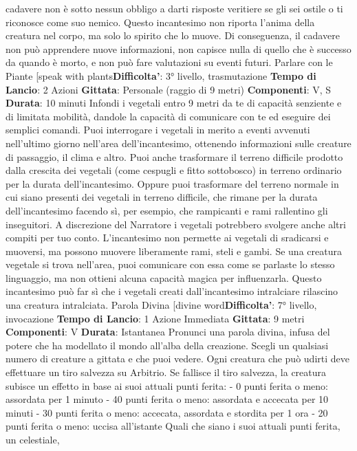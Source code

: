 \begin{multicols}{2}
cadavere non è sotto nessun obbligo a darti risposte
veritiere se gli sei ostile o ti riconosce come suo
nemico. Questo incantesimo non riporta l’anima della
creatura nel corpo, ma solo lo spirito che lo muove. Di
conseguenza, il cadavere non può apprendere nuove
informazioni, non capisce nulla di quello che è
successo da quando è morto, e non può fare
valutazioni su eventi futuri.
Parlare con le Piante
[speak with plants\textbf{Difficolta'}:
3° livello, trasmutazione
\textbf{Tempo di Lancio}: 2 Azioni
\textbf{Gittata}: Personale (raggio di 9 metri)
\textbf{Componenti}: V, S
\textbf{Durata}: 10 minuti
Infondi i vegetali entro 9 metri da te di capacità
senziente e di limitata mobilità, dandole la capacità di
comunicare con te ed eseguire dei semplici comandi.
Puoi interrogare i vegetali in merito a eventi avvenuti
nell’ultimo giorno nell’area dell’incantesimo, ottenendo
informazioni sulle creature di passaggio, il clima e altro.
Puoi anche trasformare il terreno difficile prodotto dalla
crescita dei vegetali (come cespugli e fitto sottobosco)
in terreno ordinario per la durata dell’incantesimo.
Oppure puoi trasformare del terreno normale in cui
siano presenti dei vegetali in terreno difficile, che
rimane per la durata dell’incantesimo facendo sì, per
esempio, che rampicanti e rami rallentino gli inseguitori.
A discrezione del Narratore i vegetali potrebbero svolgere
anche altri compiti per tuo conto. L’incantesimo non
permette ai vegetali di sradicarsi e muoversi, ma
possono muovere liberamente rami, steli e gambi.
Se una creatura vegetale si trova nell’area, puoi
comunicare con essa come se parlaste lo stesso
linguaggio, ma non ottieni alcuna capacità magica per
influenzarla.
Questo incantesimo può far sì che i vegetali creati
dall’incantesimo intralciare rilascino una creatura
intralciata.
Parola Divina
[divine word\textbf{Difficolta'}:
7° livello, invocazione
\textbf{Tempo di Lancio}: 1 Azione Immediata
\textbf{Gittata}: 9 metri
\textbf{Componenti}: V
\textbf{Durata}: Istantanea
Pronunci una parola divina, infusa del potere che ha
modellato il mondo all’alba della creazione. Scegli un
qualsiasi numero di creature a gittata e che puoi
vedere. Ogni creatura che può udirti deve effettuare un
tiro salvezza su Arbitrio. Se fallisce il tiro salvezza, la
creatura subisce un effetto in base ai suoi attuali punti
ferita:
- 0 punti ferita o meno: assordata per 1 minuto
- 40 punti ferita o meno: assordata e accecata per 10
minuti
- 30 punti ferita o meno: accecata, assordata e
stordita per 1 ora
- 20 punti ferita o meno: uccisa all’istante
Quali che siano i suoi attuali punti ferita, un celestiale,

\end{multicols}
